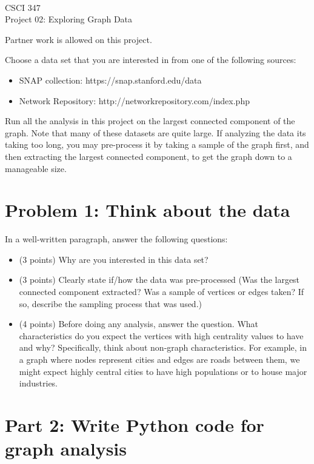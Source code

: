 \documentclass[11pt]{article}
\newcommand{\course}{CSCI 347}
\newcommand{\proj}{Project 02: Exploring Graph Data}
\begin{document}
{ ~\\
    \course \\ 
    \proj \\ 
}

Partner work is allowed on this project.

Choose a data set that you are interested in from one of the following sources:
\begin{itemize}
    \item SNAP collection: https://snap.stanford.edu/data
    \item Network Repository: http://networkrepository.com/index.php
\end{itemize}

Run all the analysis in this project on the largest connected component of the
graph. Note that many of these datasets are quite large. If analyzing the data
its taking too long, you may pre-process it by taking a sample of the graph
first, and then extracting the largest connected component, to get the graph
down to a manageable size.

\section*{Problem 1: Think about the data}

In a well-written paragraph, answer the following questions:

\begin{itemize}

    \item (3 points) Why are you interested in this data set?

    \item (3 points) Clearly state if/how the data was pre-processed (Was the
    largest connected component extracted? Was a sample of vertices or edges
    taken? If so, describe the sampling process that was used.)

    \item (4 points) Before doing any analysis, answer the question. What
    characteristics do you expect the vertices with high centrality values to
    have and why? Specifically, think about non-graph characteristics. For
    example, in a graph where nodes represent cities and edges are roads between
    them, we might expect highly central cities to have high populations or to
    house major industries.

\end{itemize}

\section*{Part 2: Write Python code for graph analysis}
\end{document}
